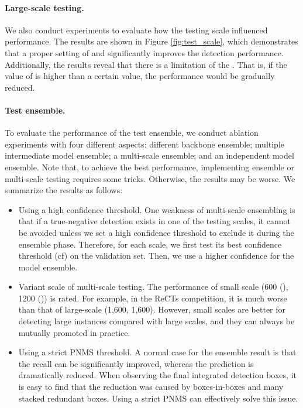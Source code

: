 \paragraph{Large-scale testing.} We also conduct  experiments to evaluate how the testing scale influenced performance. The results are shown in Figure \ref{fig:test_scale}, which demonstrates that a proper setting of  and  significantly improves the detection performance. Additionally, the results reveal that there is a limitation of the . That is, if the value of  is higher than a certain value, the performance would be gradually reduced.




\paragraph{Test ensemble.} To evaluate the performance of the test ensemble, we conduct ablation experiments with four different aspects: different backbone ensemble; multiple intermediate model ensemble; a multi-scale ensemble; and an independent model ensemble. Note that, to achieve the best performance, implementing ensemble or multi-scale testing requires some tricks. Otherwise, the results may be worse. We summarize the results as follows: 
\begin{itemize}
  \item Using a high confidence threshold. One weakness of multi-scale ensembling is that if a true-negative detection exists in one of the testing scales, it cannot be avoided unless we set a high confidence threshold to exclude it during the ensemble phase. Therefore, for each scale, we first test its best confidence threshold (cf) on the validation set. Then, we use a higher confidence for the model ensemble.
  \item Variant scale of multi-scale testing. The performance of small scale (600 (), 1200 ()) is rated. For example, in the ReCTs competition, it is much worse than that of large-scale (1,600, 1,600). However, small scales are better for
  detecting large instances compared with large scales, and they can always be mutually promoted in practice.
  \item Using a strict PNMS threshold. A normal case for the ensemble result is that the recall can be significantly improved, whereas the prediction is dramatically reduced. When observing the final integrated detection boxes, it is easy to find that the reduction was caused by boxes-in-boxes and many stacked redundant boxes. Using a strict PNMS can effectively solve this issue.
\end{itemize}



